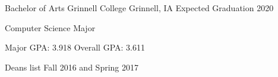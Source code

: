 \documentclass[12pt, a4paper]{awesome-cv}
\begin{document}
\makecvheader


\begin{cventries}
  \cventry
    {Bachelor of Arts}
    {Grinnell College}
    {Grinnell, IA}
    {Expected Graduation 2020}
    {
      \begin{cvitems}
      	\item {Computer Science Major}
      	\item {Major GPA: 3.918 \quad Overall GPA: 3.611}
        \item {Deans list Fall 2016 and Spring 2017}
      \end{cvitems}
    }
\end{cventries}
\end{document}
